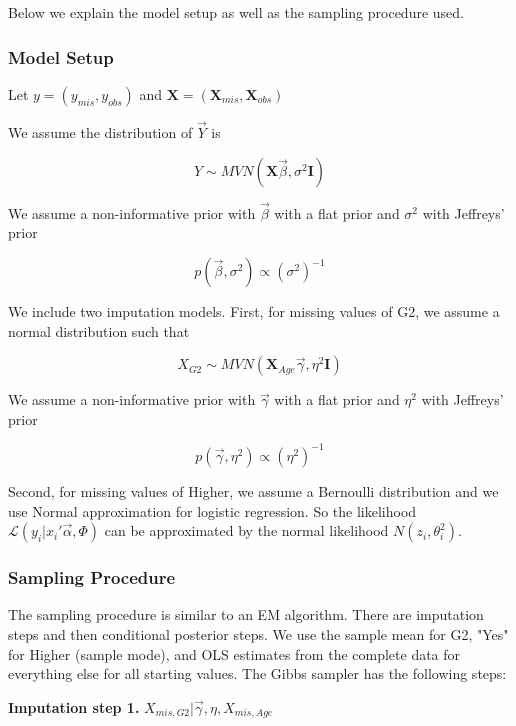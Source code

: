 \documentclass[11pt]{article}
\begin{document}
Below we explain the model setup as well as the sampling procedure used.

\subsubsection{Model Setup}

Let $y = (y_{mis}, y_{obs})$ and $\mathbf{X} = (\mathbf{X}_{mis}, \mathbf{X}_{obs})$

We assume the distribution of $\vec{Y}$ is

$$Y \sim MVN(\mathbf{X}\vec{\beta}, \sigma^2\mathbf{I})$$

We assume a non-informative prior with $\vec{\beta}$ with a flat prior and $\sigma^2$ with Jeffreys' prior

$$p(\vec{\beta}, \sigma^2) \propto (\sigma^2)^{-1}$$

\vspace{0.25in}

We include two imputation models. First, for missing values of G2, we assume a normal distribution such that

$$X_{G2} \sim MVN(\mathbf{X}_{Age}\vec{\gamma}, \eta^2\mathbf{I})$$

We assume a non-informative prior with $\vec{\gamma}$ with a flat prior and $\eta^2$ with Jeffreys' prior

$$p(\vec{\gamma}, \eta^2) \propto (\eta^2)^{-1}$$

\vspace{0.25in}

Second, for missing values of Higher, we assume a Bernoulli distribution and we use Normal approximation for logistic regression. So the likelihood $\mathcal{L}(y_i|x_i'\vec\alpha, \Phi)$ can be approximated by the normal likelihood $N(z_i, \theta^2_i)$.

\subsubsection{Sampling Procedure}

The sampling procedure is similar to an EM algorithm. There are imputation steps and then conditional posterior steps. We use the sample mean for G2, "Yes" for Higher (sample mode), and OLS estimates from the complete data for everything else for all starting values. The Gibbs sampler has the following steps:

\vspace{0.25in}

\textbf{Imputation step 1.} $X_{mis, G2}|\vec\gamma, \eta, X_{mis, Age}$
\end{document}
